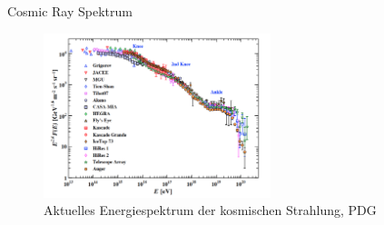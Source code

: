 \documentclass[aspectratio=1610, professionalfonts, 9pt, hyperref={colorlinks=false}]{beamer}
\begin{document}
\begin{frame}{Cosmic Ray Spektrum}
      \begin{figure}
          \centering
          \includegraphics[width=0.59\textwidth]{images/cr}
          \caption{Aktuelles Energiespektrum der kosmischen Strahlung, PDG \cite{cr}}
      \end{figure}

\end{frame}
\end{document}
